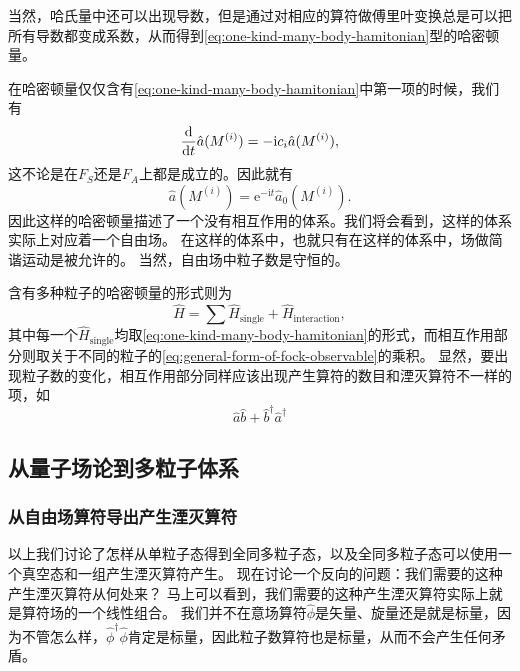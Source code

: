 \documentclass[hyperref, UTF8, a4paper]{ctexart}
\newcommand*{\ii}{\mathrm{i}}
\newcommand*{\ee}{\mathrm{e}}
\begin{document}
当然，哈氏量中还可以出现导数，但是通过对相应的算符做傅里叶变换总是可以把所有导数都变成系数，从而得到\eqref{eq:one-kind-many-body-hamitonian}型的哈密顿量。

在哈密顿量仅仅含有\eqref{eq:one-kind-many-body-hamitonian}中第一项的时候，我们有
\[
    \dv{t} \hat{a}(M^{(i)}) = - \ii c_i \hat{a} (M^{(i)}),
\]
这不论是在$F_S$还是$F_A$上都是成立的。因此就有
\[
    \hat{a} (M^{(i)}) = \ee^{- \ii t} \hat{a}_0 (M^{(i)}).
\]
因此这样的哈密顿量描述了一个没有相互作用的体系。我们将会看到，这样的体系实际上对应着一个自由场。
在这样的体系中，也就只有在这样的体系中，场做简谐运动是被允许的。
当然，自由场中粒子数是守恒的。

含有多种粒子的哈密顿量的形式则为
\begin{equation}
    \hat{H} = \sum \hat{H}_\text{single} + \hat{H}_\text{interaction},
\end{equation}
其中每一个$\hat{H}_\text{single}$均取\eqref{eq:one-kind-many-body-hamitonian}的形式，而相互作用部分则取关于不同的粒子的\eqref{eq:general-form-of-fock-observable}的乘积。
显然，要出现粒子数的变化，相互作用部分同样应该出现产生算符的数目和湮灭算符不一样的项，如
\[
    \hat{a} \hat{b} + \hat{b}^\dagger \hat{a}^\dagger
\]


\subsection{从量子场论到多粒子体系}\label{sec:from-qft-to-many-body}


\subsubsection{从自由场算符导出产生湮灭算符}\label{sec:c-a-operator-from-field}

以上我们讨论了怎样从单粒子态得到全同多粒子态，以及全同多粒子态可以使用一个真空态和一组产生湮灭算符产生。
现在讨论一个反向的问题：我们需要的这种产生湮灭算符从何处来？
马上可以看到，我们需要的这种产生湮灭算符实际上就是算符场的一个线性组合。
我们并不在意场算符$\hat{\phi}$是矢量、旋量还是就是标量，因为不管怎么样，$\hat{\phi}^\dagger \hat{\phi}$肯定是标量，因此粒子数算符也是标量，从而不会产生任何矛盾。
\end{document}
